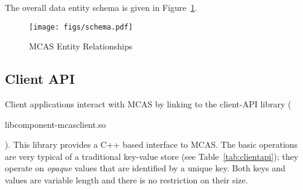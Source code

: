 \documentclass[letterpaper,twocolumn,10pt]{article}
\newcommand{\code}[1]{\begin{ttcodefont}#1\end{ttcodefont}}
\begin{document}
The overall data entity schema is given in Figure~\ref{fig:schema}.

\begin{figure}
\centering
\texttt{[image: figs/schema.pdf]}
\caption{MCAS Entity Relationships }
\label{fig:schema}
\end{figure}


\subsection{Client API} \label{subsec:Client API} 

Client applications interact with MCAS by linking to the client-API
library (\code{libcomponent-mcasclient.so}).  This library provides a
C++ based interface to MCAS.  The basic operations are very typical of
a traditional key-value store (see Table~\ref{tab:clientapi}); they
operate on \textit{opaque} values that are identified by a unique
key. Both keys and values are variable length and there is no
restriction on their size.
\end{document}
